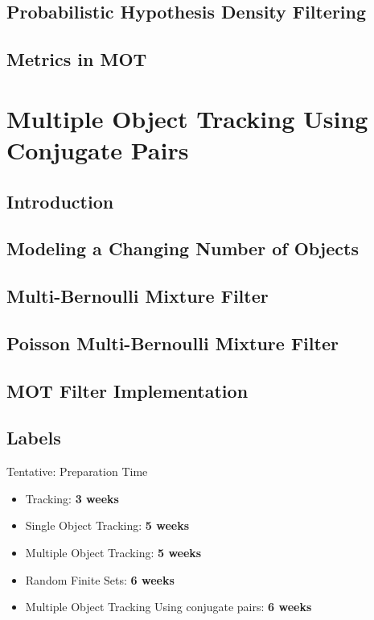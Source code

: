 \documentclass{beamer}
\begin{document}
	\subsection{Probabilistic Hypothesis Density Filtering}
	\subsection{Metrics in MOT}
	\section{Multiple Object Tracking Using Conjugate Pairs}
	\subsection{Introduction}
	\subsection{Modeling a Changing Number of Objects}
	\subsection{Multi-Bernoulli Mixture Filter}
	\subsection{Poisson Multi-Bernoulli Mixture Filter}
	\subsection{MOT Filter Implementation}
	\subsection{Labels}
	\begin{frame}{Tentative: Preparation Time}
		\begin{itemize}
			\item Tracking: \textbf{3 weeks}
			\item Single Object Tracking: \textbf{5 weeks}
			\item Multiple Object Tracking: \textbf{5 weeks}
			\item Random Finite Sets: \textbf{6 weeks}
			\item Multiple Object Tracking Using conjugate pairs: \textbf{6 weeks}
		\end{itemize}
	\end{frame}
\end{document}
